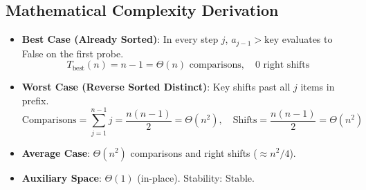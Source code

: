 \subsection{Mathematical Complexity Derivation}
\begin{itemize}
    \item \textbf{Best Case (Already Sorted)}: In every step $j$, $a_{j-1} > \text{key}$ evaluates to False on the first probe.
    $$T_{\text{best}}(n) = n - 1 = \Theta(n) \text{ comparisons}, \quad 0 \text{ right shifts}$$
    \item \textbf{Worst Case (Reverse Sorted Distinct)}: Key shifts past all $j$ items in prefix.
    $$\text{Comparisons} = \sum_{j=1}^{n-1} j = \frac{n(n - 1)}{2} = \Theta(n^2), \quad \text{Shifts} = \frac{n(n - 1)}{2} = \Theta(n^2)$$
    \item \textbf{Average Case}: $\Theta(n^2)$ comparisons and right shifts ($\approx n^2 / 4$).
    \item \textbf{Auxiliary Space}: $\Theta(1)$ (in-place). Stability: Stable.
\end{itemize}
